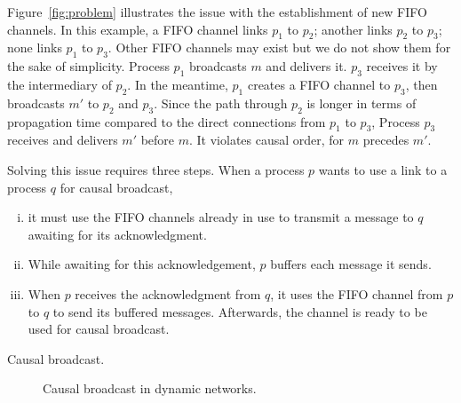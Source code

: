 Figure~\ref{fig:problem} illustrates the issue with the establishment of new
FIFO channels. In this example, a FIFO channel links $p_1$ to $p_2$; another
links $p_2$ to $p_3$; none links $p_1$ to $p_3$. Other FIFO channels may exist
but we do not show them for the sake of simplicity. Process $p_1$ broadcasts $m$
and delivers it. $p_3$ receives it by the intermediary of $p_2$. In the
meantime, $p_1$ creates a FIFO channel to $p_3$, then broadcasts $m'$ to $p_2$
and $p_3$. Since the path through $p_2$ is longer in terms of propagation time
compared to the direct connections from $p_1$ to $p_3$, Process $p_3$ receives
and delivers $m'$ before $m$. It violates causal order, for $m$ precedes $m'$.


Solving this issue requires three steps. When a process $p$ wants to use a link to
a process $q$ for causal broadcast,
\begin{enumerate}[(i)]
\item it must use the FIFO channels already in use to transmit a message to $q$
  awaiting for its acknowledgment.
\item While awaiting for this acknowledgement, $p$ buffers each message it
  sends.
\item When $p$ receives the acknowledgment from $q$, it uses the FIFO channel
  from $p$ to $q$ to send its buffered messages. Afterwards, the channel is
  ready to be used for causal broadcast.
\end{enumerate}

\begin{algorithm*}[h]
  
  \caption{\label{algo:causalbroadcast}Causal broadcast.}
\end{algorithm*}

\begin{figure}
  \begin{center}
    
    \caption{\label{fig:solved}Causal broadcast in dynamic networks.}
  \end{center}
\end{figure}


